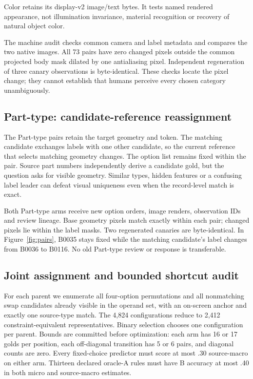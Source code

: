 \documentclass[10pt,twocolumn,letterpaper]{article}
\begin{document}
Color retains its display-v2 image/text bytes. It tests named rendered
appearance, not illumination invariance, material recognition or
recovery of natural object color.

The machine audit checks common camera and label metadata and compares
the two native images. All 73 pairs have zero changed pixels outside
the common projected body mask dilated by one antialiasing pixel.
Independent regeneration of three canary observations is byte-identical.
These checks locate the pixel change; they cannot establish that
humans perceive every chosen category unambiguously.

\subsection{Part-type: candidate-reference reassignment}
The \EvType{} Part-type pairs retain the target geometry and token.
The matching candidate exchanges labels with one other candidate,
so the current reference that selects matching geometry changes.
The option list remains fixed within the pair. Source part numbers
independently derive a candidate gold, but the question asks for visible
geometry. Similar types, hidden features or a confusing label leader
can defeat visual uniqueness even when the record-level match is exact.

Both Part-type arms receive new option orders, image renders, observation
IDs and review lineage. Base geometry pixels match exactly within each
pair; changed pixels lie within the label masks. Two regenerated
canaries are byte-identical. In Figure~\ref{fig:pairs}, B0035 stays fixed
while the matching candidate's label changes from B0036 to B0116.
No old Part-type review or response is transferable.

\subsection{Joint assignment and bounded shortcut audit}
For each parent we enumerate all four-option permutations and all
nonmatching swap candidates already visible in the operand set, with an
on-screen anchor and exactly one source-type match. The 4,824
configurations reduce to 2,412 constraint-equivalent representatives.
Binary selection chooses one configuration per parent. Bounds are
committed before optimization: each arm has 16 or 17 golds per position,
each off-diagonal transition has 5 or 6 pairs, and diagonal counts are zero.
Every fixed-choice predictor must score at most .30 source-macro on
either arm. Thirteen declared oracle-A rules must have B accuracy at
most .40 in both micro and source-macro estimates.
\end{document}
